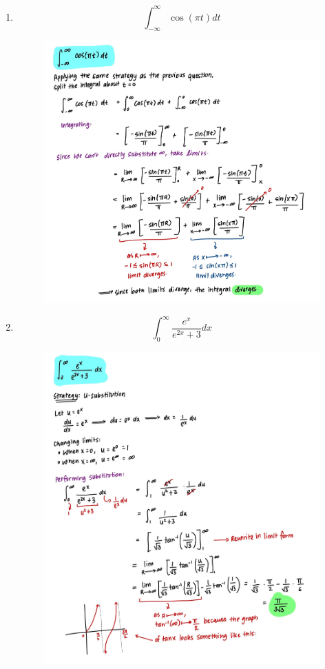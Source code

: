 \documentclass{article}
\begin{document}
\begin{enumerate}
\begin{figure}[H]
        \label{fig:Q4}
    \end{figure}
    \newpage
    \item $$\int_{-\infty}^\infty{\cos(\pi t)}dt$$
    \begin{figure}[H]
        \centering
        \includegraphics[width=\linewidth]{Q5.jpg}
        \label{fig:Q5}
    \end{figure}
    \newpage
    \item $$\int_0^\infty{\frac{e^x}{e^{2x}+3}}dx$$
    \begin{figure}[H]
        \centering
        \includegraphics[width=\linewidth]{Q6.jpg}

\end{figure}
\end{enumerate}
\end{document}
